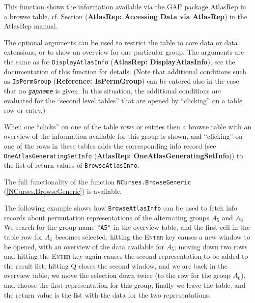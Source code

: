 \documentclass[a4paper,11pt]{report}
\begin{document}
{{{ This function shows the information available via the \textsf{GAP} package \textsf{AtlasRep} in a browse table, cf. Section{\nobreakspace} (\textbf{AtlasRep: Accessing Data via AtlasRep}) in the \textsf{AtlasRep} manual. 

 The optional arguments can be used to restrict the table to core data or data
extensions, or to show an overview for one particular group. The arguments are
the same as for \texttt{DisplayAtlasInfo} (\textbf{AtlasRep: DisplayAtlasInfo}), see the documentation of this function for details. (Note that additional
conditions such as \texttt{IsPermGroup} (\textbf{Reference: IsPermGroup}) can be entered also in the case that no \mbox{\texttt{\mdseries\slshape gapname}} is given. In this situation, the additional conditions are evaluated for the ``second level tables'' that are opened by ``clicking'' on a table row or entry.) 

 When one ``clicks'' on one of the table rows or entries then a browse table with an overview of
the information available for this group is shown, and ``clicking'' on one of the rows in these tables adds the corresponding info record (see \texttt{OneAtlasGeneratingSetInfo} (\textbf{AtlasRep: OneAtlasGeneratingSetInfo})) to the list of return values of \texttt{BrowseAtlasInfo}. 

 The full functionality of the function \texttt{NCurses.BrowseGeneric} (\ref{NCurses.BrowseGeneric}) is available. 

 The following example shows how \texttt{BrowseAtlasInfo} can be used to fetch info records about permutation representations of the
alternating groups $A_5$ and $A_6$: We search for the group name \texttt{"A5"} in the overview table, and the first cell in the table row for $A_5$ becomes selected; hitting the \textsc{Enter} key causes a new window to be opened, with an overview of the data available
for $A_5$; moving down two rows and hitting the \textsc{Enter} key again causes the second representation to be added to the result list;
hitting \textsc{Q} closes the second window, and we are back in the overview table; we move the
selection down twice (to the row for the group $A_6$), and choose the first representation for this group; finally we leave the
table, and the return value is the list with the data for the two
representations. 

}}}
\end{document}
